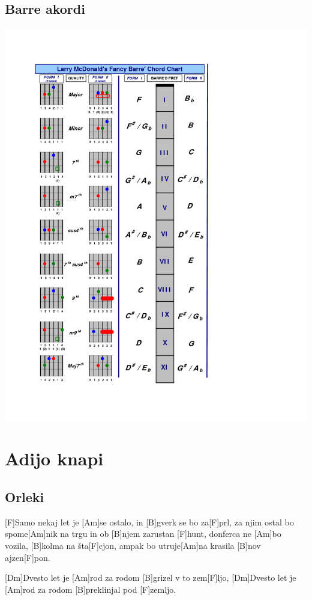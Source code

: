 \documentclass[a4paper,12pt]{article}
\begin{document}
\begin{multicols}{2}
\subsection*{Barre akordi}
\includegraphics[width=140mm]{img/barre.png}
\clearpage
\section{Adijo knapi}
\subsection*{Orleki}
\begin{guitar}
[F Am B F]

[F]Samo nekaj let je [Am]se ostalo,
in [B]gverk se bo za[F]prl,
za njim ostal bo spome[Am]nik na trgu
in ob [B]njem zarustan [F]hunt,
donferca ne [Am]bo vozila,
[B]kolma na šta[F]cjon,
ampak bo utruje[Am]na krasila
[B]nov ajzen[F]pon.


[Dm]Dvesto let je [Am]rod za rodom [B]grizel v to zem[F]ljo,
[Dm]Dvesto let je [Am]rod za rodom 
[B]preklinjal pod [F]zemljo.



\end{guitar}
\end{multicols}
\end{document}
